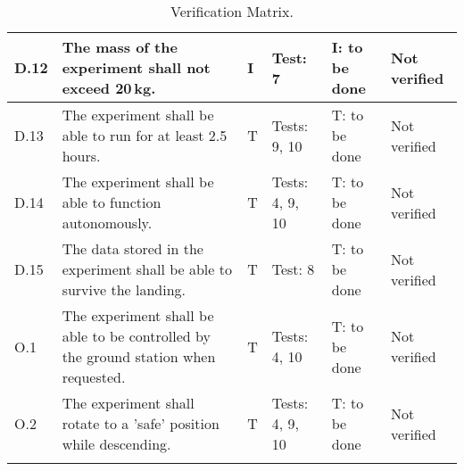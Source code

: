 \begin{longtable}[]{|m{}| m{}|m{}|m{}|m{}|m{}|}
D.12 & The mass of the experiment shall not exceed 20\,kg.
& I & Test: 7 & I: to be done & Not verified \\\hline

D.13 & The experiment shall be able to run for at least 2.5\,hours.
& T & Tests: 9, 10 & T: to be done & Not verified \\\hline

D.14 & The experiment shall be able to function autonomously.
& T & Tests: 4, 9, 10 & T: to be done & Not verified \\\hline

D.15 & The data stored in the experiment shall be able to survive the landing.
& T & Test: 8 & T: to be done & Not verified \\\hline

O.1 & The experiment shall be able to be controlled by the ground station when requested.
& T & Tests: 4, 10 & T: to be done & Not verified \\\hline

O.2 & The experiment shall rotate to a 'safe' position while descending.
& T & Tests: 4, 9, 10 & T: to be done & Not verified \\\hline

\caption{Verification Matrix.}
\label{tab:var-mat}
\end{longtable}
\raggedbottom